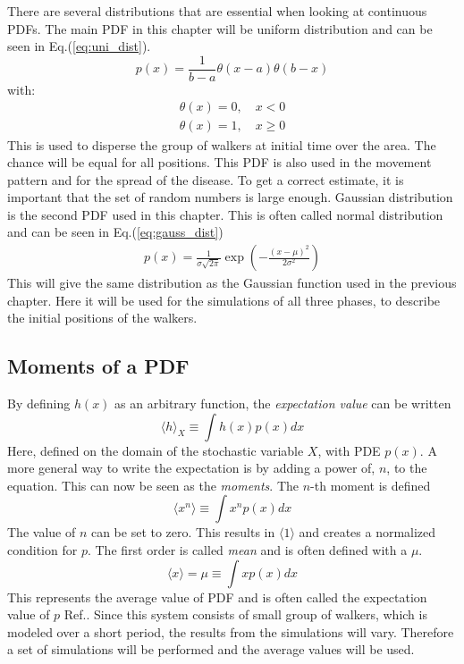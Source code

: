 \documentclass[%
twoside,                 %
final,                   %
chapterprefix=true,      %
open=right               %
10pt]{book}
\begin{document}
There are several distributions that are essential when looking at continuous PDFs. The main PDF in this chapter will be uniform distribution and can be seen in Eq.(\ref{eq:uni_dist}).
\begin{equation} \label{eq:uni_dist}
p(x) = \frac{1}{b-a}\theta(x-a)\theta(b-x)
\end{equation}
with:
\begin{equation}
	\begin{aligned}
    \theta(x) = 0,\quad x < 0 \\
    \theta(x) = 1,\quad x \geq 0
	\end{aligned}
\end{equation}
This is used to disperse the group of walkers at initial time over the area. The chance will be equal for all positions. This PDF is also used in the movement pattern and for the spread of the disease. To get a correct estimate, it is important that the set of random numbers is large enough. Gaussian distribution is the second PDF used in this chapter. This is often called normal distribution and can be seen in Eq.(\ref{eq:gauss_dist})
\begin{equation} \label{eq:gauss_dist}
	\begin{aligned}
    p(x) = \frac{1}{\sigma \sqrt{2\pi}} \exp(-\frac{(x-\mu)^2}{2\sigma^2})
	\end{aligned}
\end{equation}
This will give the same distribution as the Gaussian function used in the previous chapter. Here it will be used for the simulations of all three phases, to describe the initial positions of the walkers. 

\subsection{Moments of a PDF}
By defining $h(x)$ as an arbitrary function, the \emph{expectation value} can be written
\begin{equation}
    \langle h \rangle_X \equiv \int h(x)p(x)dx
\end{equation}
Here, defined on the domain of the stochastic variable $X$, with PDE $p(x)$. A more general way to write the expectation is by adding a power of, $n$, to the equation. This can now be seen as the \emph{moments}. The $n$-th moment is defined
\begin{equation}
    \langle x^n \rangle \equiv \int x^np(x)dx
\end{equation}
The value of $n$ can be set to zero. This results in $\langle 1 \rangle$ and creates a normalized condition for $p$. The first order is called \emph{mean} and is often defined with a $\mu$.
\begin{equation}
    \langle x \rangle = \mu \equiv \int xp(x)dx
\end{equation}
This represents the average value of PDF and is often called the expectation value of $p$ Ref.\cite{hjorth2011computational}. Since this system consists of small group of walkers, which is modeled over a short period, the results from the simulations will vary. Therefore a set of simulations will be performed and the average values will be used. 
\end{document}
